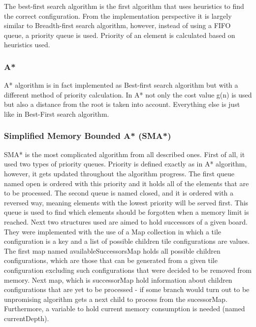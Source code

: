 \documentclass[12pt]{article}
\begin{document}
The best-first search algorithm is the first algorithm that uses heuristics to find the correct configuration. From the implementation perspective it is largely similar to Breadth-first search algorithm, however, instead of using a FIFO queue, a priority queue is used. Priority of an element is calculated based on heuristics used.

\subsubsection{A*}

A* algorithm is in fact implemented as Best-first search algorithm but with a different method of priority calculation. In A* not only the cost value g(n) is used but also a distance from the root is taken into account. Everything else is just like in Best-First search algorithm.


\subsubsection{Simplified Memory Bounded A* (SMA*)}

SMA* is the most complicated algorithm from all described ones. First of all, it used two types of priority queues. Priority is defined exactly as in A* algorithm, however, it gets updated throughout the algorithm progress. The first queue named open is ordered with this priority and it holds all of the elements that are to be processed. The second queue is named closed, and it is ordered with a reversed way, meaning elements with the lowest priority will be served first. This queue is used to find which elements should be forgotten when a memory limit is reached. Next two structures used are aimed to hold successors of a given board. They were implemented with the use of a Map collection in which a tile configuration is a key and a list of possible children tile configurations are values. The first map named availableSuccessorsMap holds all possible children configurations, which are those that can be generated from a given tile configuration excluding such configurations that were decided to be removed from memory. Next map, which is successorMap hold information about children configurations that are yet to be processed - if some branch would turn out to be unpromising algorithm gets a next child to process from the sucessorMap. Furthermore, a variable to hold current memory consumption is needed (named currentDepth).
\end{document}
